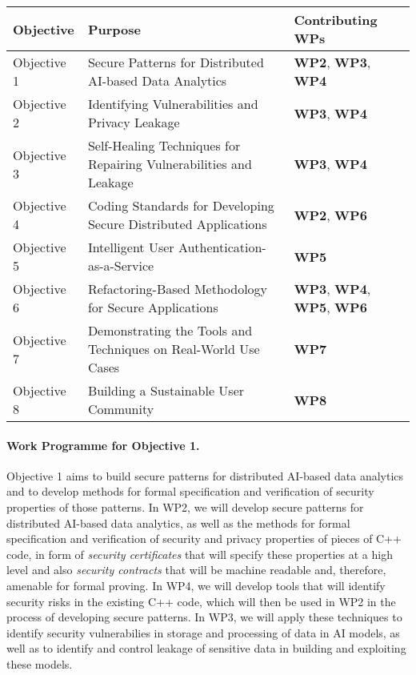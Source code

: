 \documentclass[a4paper,11pt]{article}
\begin{document}
\vspace{-8pt}
\begin{center}
\begin{tabular}{|l|l|l|}\hline
\textbf{Objective} & \textbf{Purpose} & \textbf{Contributing WPs} \\\hline \hline
Objective 1 & Secure Patterns for Distributed AI-based Data Analytics & \textbf{WP2}, \textbf{WP3}, \textbf{WP4} \\\hline
Objective 2 & Identifying Vulnerabilities and Privacy Leakage & \textbf{WP3}, \textbf{WP4} \\\hline
Objective 3 & Self-Healing Techniques for Repairing Vulnerabilities and Leakage & \textbf{WP3}, \textbf{WP4} \\\hline
Objective 4 & Coding Standards for Developing Secure Distributed Applications & \textbf{WP2}, \textbf{WP6} \\\hline
Objective 5 & Intelligent User Authentication-as-a-Service & \textbf{WP5} \\\hline
Objective 6 & Refactoring-Based Methodology for Secure Applications & \textbf{WP3}, \textbf{WP4}, \textbf{WP5}, \textbf{WP6} \\\hline
Objective 7 & Demonstrating the Tools and Techniques on Real-World Use Cases & \textbf{WP7}\\\hline
Objective 8 & Building a Sustainable User Community & \textbf{WP8}\\\hline
\end{tabular}
\end{center}

\paragraph*{Work Programme for Objective 1.}

Objective 1 aims to build secure patterns for distributed AI-based data analytics and to develop methods for formal specification and verification of security properties of those patterns. In WP2, we will develop secure patterns for distributed AI-based data analytics, as well as the methods for formal specification and verification of security and privacy properties of pieces of C++ code, in form of \emph{security certificates} that will specify these properties at a high level and also \emph{security contracts} that will be machine readable and, therefore, amenable for formal proving. In WP4, we will develop tools that will identify security risks in the existing C++ code, which will then be used in WP2 in the process of developing secure patterns. In WP3, we will apply these techniques to identify security vulnerabilies in storage and processing of data in AI models, as well as to identify and control leakage of sensitive data in building and exploiting these models. 
\end{document}
